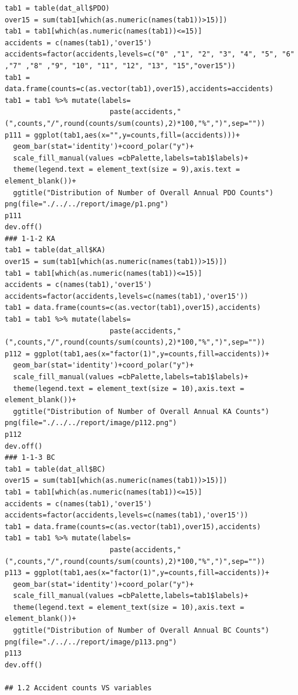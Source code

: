\documentclass[11pt]{scrartcl} %
\begin{document}
\begin{lstlisting}
tab1 = table(dat_all$PDO)
over15 = sum(tab1[which(as.numeric(names(tab1))>15)])
tab1 = tab1[which(as.numeric(names(tab1))<=15)]
accidents = c(names(tab1),'over15')
accidents=factor(accidents,levels=c("0" ,"1", "2", "3", "4", "5", "6" ,"7" ,"8" ,"9", "10", "11", "12", "13", "15","over15"))
tab1 = data.frame(counts=c(as.vector(tab1),over15),accidents=accidents)
tab1 = tab1 %>% mutate(labels=
                         paste(accidents,"(",counts,"/",round(counts/sum(counts),2)*100,"%",")",sep=""))
p111 = ggplot(tab1,aes(x="",y=counts,fill=(accidents)))+
  geom_bar(stat='identity')+coord_polar("y")+
  scale_fill_manual(values =cbPalette,labels=tab1$labels)+
  theme(legend.text = element_text(size = 9),axis.text = element_blank())+
  ggtitle("Distribution of Number of Overall Annual PDO Counts")
png(file="./../../report/image/p1.png")
p111
dev.off()
### 1-1-2 KA
tab1 = table(dat_all$KA)
over15 = sum(tab1[which(as.numeric(names(tab1))>15)])
tab1 = tab1[which(as.numeric(names(tab1))<=15)]
accidents = c(names(tab1),'over15')
accidents=factor(accidents,levels=c(names(tab1),'over15'))
tab1 = data.frame(counts=c(as.vector(tab1),over15),accidents)
tab1 = tab1 %>% mutate(labels=
                         paste(accidents,"(",counts,"/",round(counts/sum(counts),2)*100,"%",")",sep=""))
p112 = ggplot(tab1,aes(x="factor(1)",y=counts,fill=accidents))+
  geom_bar(stat='identity')+coord_polar("y")+
  scale_fill_manual(values =cbPalette,labels=tab1$labels)+
  theme(legend.text = element_text(size = 10),axis.text = element_blank())+
  ggtitle("Distribution of Number of Overall Annual KA Counts")
png(file="./../../report/image/p112.png")
p112
dev.off()
### 1-1-3 BC
tab1 = table(dat_all$BC)
over15 = sum(tab1[which(as.numeric(names(tab1))>15)])
tab1 = tab1[which(as.numeric(names(tab1))<=15)]
accidents = c(names(tab1),'over15')
accidents=factor(accidents,levels=c(names(tab1),'over15'))
tab1 = data.frame(counts=c(as.vector(tab1),over15),accidents)
tab1 = tab1 %>% mutate(labels=
                         paste(accidents,"(",counts,"/",round(counts/sum(counts),2)*100,"%",")",sep=""))
p113 = ggplot(tab1,aes(x="factor(1)",y=counts,fill=accidents))+
  geom_bar(stat='identity')+coord_polar("y")+
  scale_fill_manual(values =cbPalette,labels=tab1$labels)+
  theme(legend.text = element_text(size = 10),axis.text = element_blank())+
  ggtitle("Distribution of Number of Overall Annual BC Counts")
png(file="./../../report/image/p113.png")
p113
dev.off()

## 1.2 Accident counts VS variables


\end{lstlisting}
\end{document}
